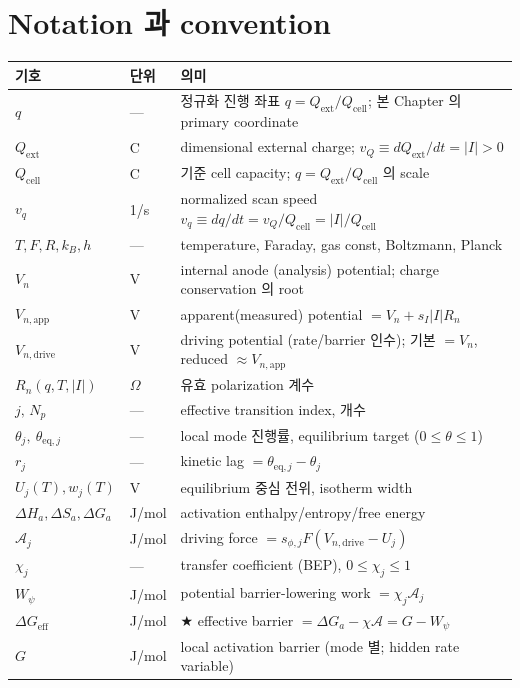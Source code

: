 \documentclass[11pt,a4paper]{article}
\newcommand{\eff}{\mathrm{eff}}
\newcommand{\eq}{\mathrm{eq}}
\newcommand{\app}{\mathrm{app}}
\newcommand{\dimedrive}{\mathrm{drive}}
\newcommand{\cell}{\mathrm{cell}}
\newcommand{\ext}{\mathrm{ext}}
\begin{document}
\section{Notation 과 convention}\label{sec:notation}
\begin{longtable}{p{} p{} p{}}
\toprule 기호 & 단위 & 의미 \\ \midrule \endhead
$q$ & --- & 정규화 진행 좌표 $q=Q_\ext/Q_\cell$; 본 Chapter 의 primary coordinate \\
$Q_\ext$ & C & dimensional external charge; $v_Q\equiv dQ_\ext/dt=|I|>0$ \\
$Q_\cell$ & C & 기준 cell capacity; $q=Q_\ext/Q_\cell$ 의 scale \\
$v_q$ & 1/s & normalized scan speed $v_q\equiv dq/dt=v_Q/Q_\cell=|I|/Q_\cell$ \\
$T,F,R,k_B,h$ & --- & temperature, Faraday, gas const, Boltzmann, Planck \\
$V_n$ & V & internal anode (analysis) potential; charge conservation 의 root \\
$V_{n,\app}$ & V & apparent(measured) potential $=V_n+s_I|I|R_n$ \\
$V_{n,\dimedrive}$ & V & driving potential (rate/barrier 인수); 기본 $=V_n$, reduced $\approx V_{n,\app}$ \\
$R_n(q,T,|I|)$ & $\Omega$ & 유효 polarization 계수 \\
$j,\,N_p$ & --- & effective transition index, 개수 \\
$\theta_j,\ \theta_{\eq,j}$ & --- & local mode 진행률, equilibrium target ($0\!\le\!\theta\!\le\!1$) \\
$r_j$ & --- & kinetic lag $=\theta_{\eq,j}-\theta_j$ \\
$U_j(T),w_j(T)$ & V & equilibrium 중심 전위, isotherm width \\
$\Delta H_{a},\Delta S_{a},\Delta G_a$ & J/mol & activation enthalpy/entropy/free energy \\
$\mathcal A_j$ & J/mol & driving force $=s_{\phi,j}F(V_{n,\dimedrive}-U_j)$ \\
$\chi_j$ & --- & transfer coefficient (BEP), $0\le\chi_j\le1$ \\
$W_\psi$ & J/mol & potential barrier-lowering work $=\chi_j\mathcal A_j$ \\
$\Delta G_{\eff}$ & J/mol & ★ effective barrier $=\Delta G_a-\chi\mathcal A=G-W_\psi$ \\
$G$ & J/mol & local activation barrier (mode 별; hidden rate variable) \\

\end{longtable}
\end{document}

